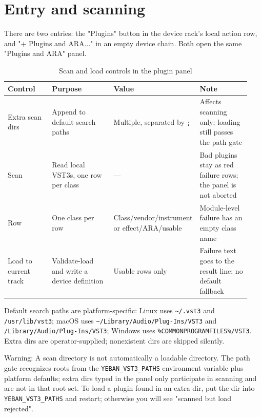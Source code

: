 \section{Entry and scanning}

There are two entries: the "Plugins" button in the device rack's local action row, and "+ Plugins and ARA..." in an empty device chain. Both open the same "Plugins and ARA" panel.

\begin{table}[htbp]
\centering
\small
\begin{tabular}{@{}p{0.20\linewidth}p{0.30\linewidth}p{0.20\linewidth}p{0.24\linewidth}@{}}
\hline
Control & Purpose & Value & Note \\
\hline
Extra scan dirs & Append to default search paths & Multiple, separated by \texttt{;} & Affects scanning only; loading still passes the path gate \\
Scan & Read local VST3s, one row per class & — & Bad plugins stay as red failure rows; the panel is not aborted \\
Row & One class per row & Class/\allowbreak vendor/\allowbreak instrument or effect/\allowbreak ARA/\allowbreak usable & Module-level failure has an empty class name \\
Load to current track & Validate-load and write a device definition & Usable rows only & Failure text goes to the result line; no default fallback \\
\hline
\end{tabular}
\caption{Scan and load controls in the plugin panel}
\label{tab:plugin-panel-controls}
\end{table}

Default search paths are platform-specific: Linux uses \texttt{\textasciitilde/.vst3} and \texttt{/usr/lib/vst3}; macOS uses \texttt{\textasciitilde/Library/\allowbreak Audio/\allowbreak Plug-Ins/\allowbreak VST3} and \texttt{/Library/Audio/Plug-Ins/VST3}; Windows uses \texttt{\%COMMON\allowbreak PROGRAMFILES\%/\allowbreak VST3}. Extra dirs are operator-supplied; nonexistent dirs are skipped silently.

Warning: A scan directory is not automatically a loadable directory. The path gate recognizes roots from the \texttt{YEBAN\_VST3\_PATHS} environment variable plus platform defaults; extra dirs typed in the panel only participate in scanning and are not in that root set. To load a plugin found in an extra dir, put the dir into \texttt{YEBAN\_VST3\_PATHS} and restart; otherwise you will see "scanned but load rejected".

